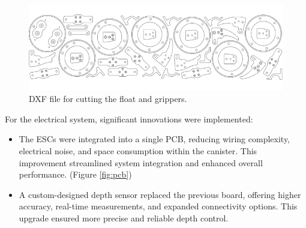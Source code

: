\begin{figure}[h]
    \centering
    \includegraphics[width=0.8\columnwidth]{Sections/2Design Rationale/images/DXF.png}
    \caption{DXF file for cutting the float and grippers.}
    \label{fig:dxf}
\end{figure}

For the electrical system, significant innovations were implemented:

\vspace{-0.5\baselineskip}
\begin{itemize}
    \setlength{\itemsep}{0pt}
    \item The ESCs were integrated into a single PCB, reducing wiring complexity, electrical noise, and space consumption within the canister. This improvement streamlined system integration and enhanced overall performance. (Figure \ref{fig:pcb})
    \item A custom-designed depth sensor replaced the previous board, offering higher accuracy, real-time measurements, and expanded connectivity options. This upgrade ensured more precise and reliable depth control.
\end{itemize}

